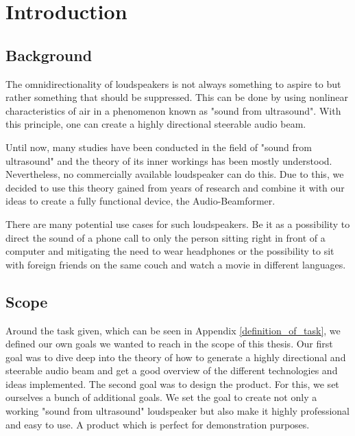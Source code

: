 \newcommand{\package}{\emph}

\chapter{Introduction}
\section{Background}
The omnidirectionality of loudspeakers is not always something to aspire to but rather something that should be suppressed. This can be done by using nonlinear characteristics of air in a phenomenon known as "sound from ultrasound". With this principle, one can create a highly directional steerable audio beam. 

Until now, many studies have been conducted in the field of "sound from ultrasound" and the theory of its inner workings has been mostly understood. Nevertheless, no commercially available loudspeaker can do this. Due to this, we decided to use this theory gained from years of research and combine it with our ideas to create a fully functional device, the Audio-Beamformer. 

There are many potential use cases for such loudspeakers. Be it as a possibility to direct the sound of a phone call to only the person sitting right in front of a computer and mitigating the need to wear headphones or the possibility to sit with foreign friends on the same couch and watch a movie in different languages. 
\section{Scope}
Around the task given, which can be seen in Appendix \ref{definition_of_task}, we defined our own goals we wanted to reach in the scope of this thesis. 
Our first goal was to dive deep into the theory of how to generate a highly directional and steerable audio beam and get a good overview of the different technologies and ideas implemented. 
The second goal was to design the product. For this, we set ourselves a bunch of additional goals. We set the goal to create not only a working "sound from ultrasound" loudspeaker but also make it highly professional and easy to use. A product which is perfect for demonstration purposes.
\newpage


